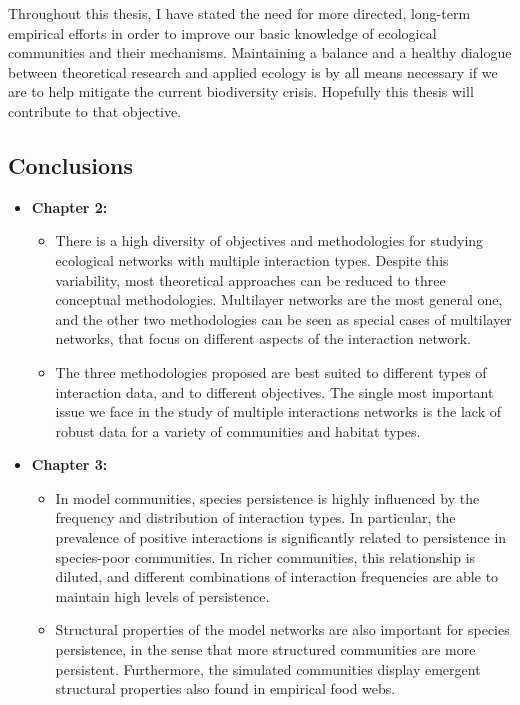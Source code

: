 Throughout this thesis, I have stated the need for more directed, long-term empirical efforts in order to improve our basic knowledge of ecological communities and their mechanisms. Maintaining a balance and a healthy dialogue between theoretical research and applied ecology is by all means necessary if we are to help mitigate the current biodiversity crisis. Hopefully this thesis will contribute to that objective.

\subsection*{Conclusions}

\begin{itemize}
  \item \textbf{Chapter 2:}
  \begin{itemize}
    \item There is a high diversity of objectives and methodologies for studying ecological networks with multiple interaction types. Despite this variability, most theoretical approaches can be reduced to three conceptual methodologies. Multilayer networks are the most general one, and the other two methodologies can be seen as special cases of multilayer networks, that focus on different aspects of the interaction network.
    \item The three methodologies proposed are best suited to different types of interaction data, and to different objectives. The single most important issue we face in the study of multiple interactions networks is the lack of robust data for a variety of communities and habitat types.
  \end{itemize}
  \item \textbf{Chapter 3:}
  \begin{itemize}
    \item In model communities, species persistence is highly influenced by the frequency and distribution of interaction types. In particular, the prevalence of positive interactions is significantly related to persistence in species-poor communities. In richer communities, this relationship is diluted, and different combinations of interaction frequencies are able to maintain high levels of persistence.
    \item Structural properties of the model networks are also important for species persistence, in the sense that more structured communities are more persistent. Furthermore, the simulated communities display emergent structural properties also found in empirical food webs.

\end{itemize}
\end{itemize}
